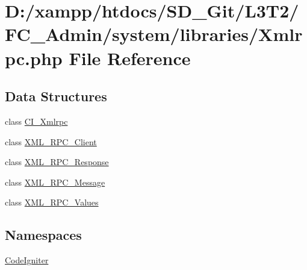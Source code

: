 \hypertarget{_xmlrpc_8php}{}\section{D\+:/xampp/htdocs/\+S\+D\+\_\+\+Git/\+L3\+T2/\+F\+C\+\_\+\+Admin/system/libraries/\+Xmlrpc.php File Reference}
\label{_xmlrpc_8php}
\subsection*{Data Structures}
\begin{DoxyCompactItemize}
\item 
class \hyperlink{class_c_i___xmlrpc}{C\+I\+\_\+\+Xmlrpc}
\item 
class \hyperlink{class_x_m_l___r_p_c___client}{X\+M\+L\+\_\+\+R\+P\+C\+\_\+\+Client}
\item 
class \hyperlink{class_x_m_l___r_p_c___response}{X\+M\+L\+\_\+\+R\+P\+C\+\_\+\+Response}
\item 
class \hyperlink{class_x_m_l___r_p_c___message}{X\+M\+L\+\_\+\+R\+P\+C\+\_\+\+Message}
\item 
class \hyperlink{class_x_m_l___r_p_c___values}{X\+M\+L\+\_\+\+R\+P\+C\+\_\+\+Values}
\end{DoxyCompactItemize}
\subsection*{Namespaces}
\begin{DoxyCompactItemize}
\item 
 \hyperlink{namespace_code_igniter}{Code\+Igniter}
\end{DoxyCompactItemize}
